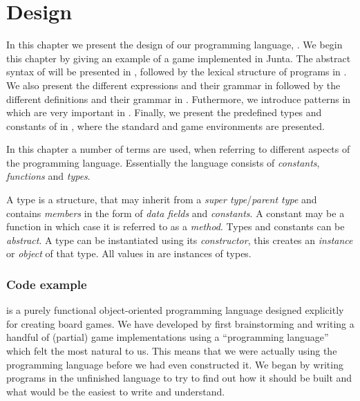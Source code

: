 \chapter{Design}
\label{chap:design}

In this chapter we present the design of our programming language,
\productname{}. We begin this chapter by giving an example of a
game implemented in Junta. The abstract syntax of \productname{}
will be presented in , followed by the
lexical structure of programs in .
We also present the different expressions and their grammar in
 followed by the different definitions and their
grammar in . Futhermore, we introduce patterns
in  which are very important in \productname{}.
Finally, we present the predefined types and constants of \productname{}
in , where the standard and game environments are
presented.

In this chapter a number of terms are used, when referring to different aspects
of the programming language. Essentially the language consists of
\emph{constants}, \emph{functions} and \emph{types}.

A type is a structure, that may inherit from a \emph{super
type}/\emph{parent type} and contains \emph{members} in the form of \emph{data
fields} and \emph{constants}. A constant may be a function in which case it is
referred to as a \emph{method}. Types and constants can be \emph{abstract}. A
type can be instantiated using its \emph{constructor}, this creates an
\emph{instance} or \emph{object} of that type. All values in \productname{} are
instances of types.

\subsection*{Code example}

\productname{} is a purely functional object-oriented programming language
designed explicitly for creating board games. We have developed \productname{}
by first brainstorming and writing a handful of (partial) game implementations using a
``programming language'' which felt the most natural to us. This means that we 
were actually using the programming language before we had even constructed
it. We began by writing programs in the unfinished language to try to find out
how it should be built and what would be the easiest to write and understand. 

